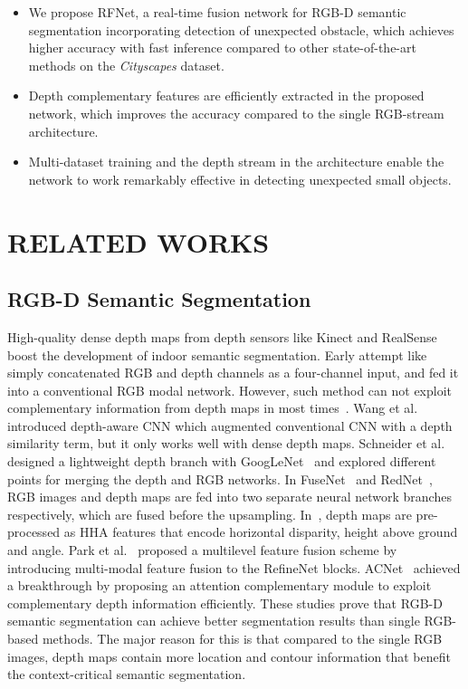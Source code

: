 \documentclass[letterpaper, 10 pt, journal, twoside]{ieeetran}
\begin{document}
\begin{itemize}
\item We propose RFNet, a real-time fusion network for RGB-D semantic segmentation incorporating detection of unexpected obstacle, which achieves higher accuracy with fast inference compared to other state-of-the-art methods on the \textit{Cityscapes} dataset.
\item Depth complementary features are efficiently extracted in the proposed network, which improves the accuracy compared to the single RGB-stream architecture.
\item Multi-dataset training and the depth stream in the architecture enable the network to work remarkably effective in detecting unexpected small objects.
\end{itemize}







\section{RELATED WORKS}



\subsection{RGB-D Semantic Segmentation}


High-quality dense depth maps from depth sensors like Kinect and RealSense 
boost the development of indoor semantic segmentation. 
Early attempt like~\cite{couprie2013indoor} simply concatenated RGB and depth channels as a four-channel input, and fed it into a conventional RGB modal network. However, such method can not exploit complementary information from depth maps in most times~\cite{ngiam2011multimodal}. Wang et al.~\cite{depthawarecnn} introduced depth-aware CNN which augmented conventional CNN with a depth similarity term, but it only works well with dense depth maps. Schneider et al.~\cite{schneider2017multimodal} designed a lightweight depth branch with GoogLeNet~\cite{szegedy2015going} and explored different points for merging the depth and RGB networks.
In FuseNet~\cite{hazirbas2016fusenet} and RedNet~\cite{jiang2018rednet}, RGB images and depth maps are fed into two separate neural network branches respectively, which are fused before the upsampling. In~\cite{gupta2014learning}, depth maps are pre-processed as HHA features that encode horizontal disparity, height above ground and angle. Park et al.~\cite{park2017rdfnet} proposed a multilevel feature fusion scheme by introducing multi-modal feature fusion to the RefineNet blocks. ACNet~\cite{hu2019acnet} achieved a breakthrough by proposing an attention complementary module to exploit complementary depth information efficiently. 
These studies prove that RGB-D semantic segmentation can achieve better segmentation results than single RGB-based methods. The major reason for this is that compared to the single RGB images, depth maps contain more location and contour information that benefit the context-critical semantic segmentation. 
\end{document}
